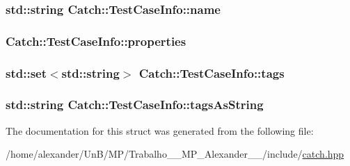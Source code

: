 \hypertarget{structCatch_1_1TestCaseInfo_a463794e2f5cfead307c93efd134ade36}{
\subsubsection[{name}]{\setlength{\rightskip}{0pt plus 5cm}std\-::string Catch\-::\-Test\-Case\-Info\-::name}}\label{structCatch_1_1TestCaseInfo_a463794e2f5cfead307c93efd134ade36}
\hypertarget{structCatch_1_1TestCaseInfo_afc1e84bd7a2e180895a06d9131302af0}{
\subsubsection[{properties}]{ Catch\-::\-Test\-Case\-Info\-::properties}}\label{structCatch_1_1TestCaseInfo_afc1e84bd7a2e180895a06d9131302af0}
\hypertarget{structCatch_1_1TestCaseInfo_a045f62e7719a8760a5b456f7fd2dc97c}{
\subsubsection[{tags}]{\setlength{\rightskip}{0pt plus 5cm}std\-::set$<$std\-::string$>$ Catch\-::\-Test\-Case\-Info\-::tags}}\label{structCatch_1_1TestCaseInfo_a045f62e7719a8760a5b456f7fd2dc97c}
\hypertarget{structCatch_1_1TestCaseInfo_ac65c2d36fd36f71e9bf782b2ea245c64}{
\subsubsection[{tags\-As\-String}]{\setlength{\rightskip}{0pt plus 5cm}std\-::string Catch\-::\-Test\-Case\-Info\-::tags\-As\-String}}\label{structCatch_1_1TestCaseInfo_ac65c2d36fd36f71e9bf782b2ea245c64}


The documentation for this struct was generated from the following file\-:\begin{DoxyCompactItemize}
\item 
/home/alexander/\-Un\-B/\-M\-P/\-Trabalho\-\_\-\_\-\-M\-P\-\_\-\-Alexander\-\_\-\_/include/\hyperlink{catch_8hpp}{catch.\-hpp}\end{DoxyCompactItemize}

